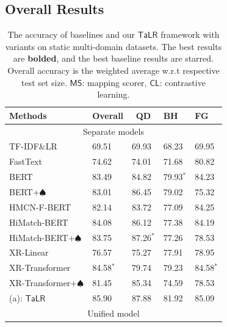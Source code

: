 \subsection{Overall Results}
\label{sec:all res}

\begin{table}[!th]
\small
\setlength{\tabcolsep}{3.5pt}
  \begin{threeparttable}[b]
  \caption{The accuracy of baselines and our $\mathsf{TaLR}$ framework with variants on static multi-domain datasets. The best results are \textbf{bolded}, and the best baseline results are starred. Overall accuracy is the weighted average w.r.t respective test set size. $\mathsf{MS}$: mapping scorer, $\mathsf{CL}$: contrastive learning. 
  }
  \label{tb:all}
  \centering
  \begin{tabular}{l|llll}
    \toprule
    Methods & Overall & \multicolumn{1}{c}{QD} & \multicolumn{1}{l}{\;BH} & \multicolumn{1}{l}{\;FG}\\
    \midrule
    \multicolumn{5}{c}{Separate models}\\
    \midrule
    TF-IDF\&LR $ $ & 69.51 & 69.93 & 68.23 & 69.95 \\
    FastText $ $ & 74.62 & 74.01 & 71.68 & 80.82 \\
    BERT $ $ & 83.49 & 84.82 & 79.93$^*$ & 84.23\\
    BERT+$\spadesuit$  $ $ & 83.01 & 86.45 & 79.02 & 75.32\\
    HMCN-F-BERT $ $ & 82.14 & 83.72 & 77.09 & 84.25 \\
    HiMatch-BERT $ $ & 84.08 & 86.12 & 77.38 & 84.19 \\
    HiMatch-BERT+$\spadesuit$$ $ & 83.75 & 87.26$^*$ & 77.26 & 78.53 \\
    XR-Linear$ $ & 76.57& 75.27 & 77.91 & 78.95 \\
    XR-Transformer$ $ & 84.58$^*$ & 79.74 & 79.23 & 84.58$^*$ \\
    XR-Transformer+$\spadesuit$$ $ & 81.45 & 85.34 & 74.59 & 78.53  \\
    \midrule
    (a): $\mathsf{TaLR}$ $ $ & 85.90 & 87.88 & 81.92 & 85.09\\
    \midrule
    \multicolumn{5}{c}{Unified model}\\
    \midrule

\end{tabular}
\end{threeparttable}
\end{table}
